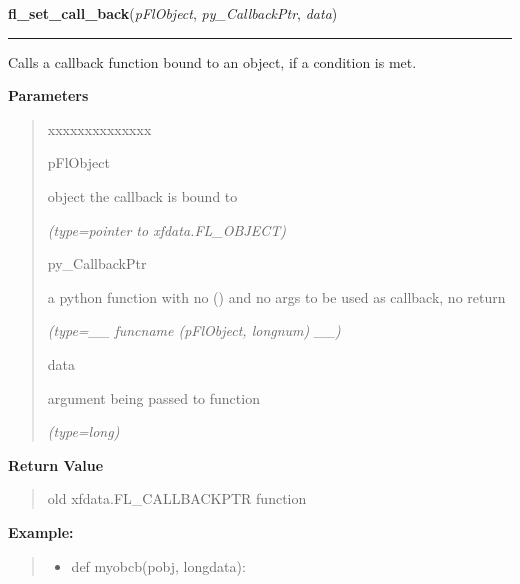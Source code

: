 \hspace{.8\funcindent}\begin{boxedminipage}{\funcwidth}

    \raggedright \textbf{fl\_set\_call\_back}(\textit{pFlObject}, \textit{py\_CallbackPtr}, \textit{data})

    \vspace{-1.5ex}

    \rule{\textwidth}{0.5\fboxrule}
\setlength{\parskip}{2ex}
    Calls a callback function bound to an object, if a condition is met.

\setlength{\parskip}{1ex}
      \textbf{Parameters}
      \vspace{-1ex}

      \begin{quote}
        \begin{Ventry}{xxxxxxxxxxxxxx}

          \item[pFlObject]

          object the callback is bound to

            {\it (type=pointer to xfdata.FL\_OBJECT)}

          \item[py\_CallbackPtr]

          a python function with no () and no args to be used as callback, 
          no return

            {\it (type=\_\_ funcname (pFlObject, longnum) \_\_)}

          \item[data]

          argument being passed to function

            {\it (type=long)}

        \end{Ventry}

      \end{quote}

      \textbf{Return Value}
    \vspace{-1ex}

      \begin{quote}
      old xfdata.FL\_CALLBACKPTR function

      \end{quote}

\textbf{Example:}
\begin{quote}
  \begin{itemize}

  \item
    \setlength{\parskip}{0.6ex}
def myobcb(pobj, longdata):




\end{itemize}
\end{quote}
\end{boxedminipage}

